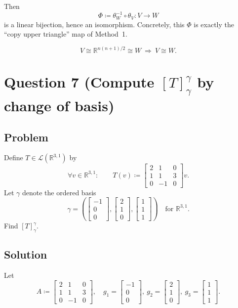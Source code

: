 \documentclass[12pt]{article}
\newcommand{\R}{\mathbb{R}}
\newcommand{\cL}{\mathcal{L}}
\begin{document}
Then
\[
\Phi \coloneqq \theta_W^{-1}\circ \theta_V:V\to W
\]
is a linear bijection, hence an isomorphism. Concretely, this $\Phi$ is exactly the ``copy upper triangle'' map of Method~1.

\[
\boxed{\,V\cong \R^{n(n+1)/2}\cong W\ \Rightarrow\ V\cong W.\,}
\]

\newpage
\section{Question 7 (Compute $[T]_{\gamma}^{\gamma}$ by change of basis)}
\subsection{Problem}
Define $T\in \cL(\R^{3,1})$ by
\[
\forall v\in \R^{3,1}:\qquad
T(v)\coloneqq
\begin{bmatrix}
2&1&0\\
1&1&3\\
0&-1&0
\end{bmatrix}v.
\]
Let $\gamma$ denote the ordered basis
\[
\gamma=\left(
\begin{bmatrix}-1\\0\\0\end{bmatrix},
\begin{bmatrix}2\\1\\0\end{bmatrix},
\begin{bmatrix}1\\1\\1\end{bmatrix}
\right)
\quad\text{for }\R^{3,1}.
\]
Find $[T]_{\gamma}^{\gamma}$.

\subsection{Solution}
Let
\[
A\coloneqq
\begin{bmatrix}
2&1&0\\
1&1&3\\
0&-1&0
\end{bmatrix},
\quad
g_1=\begin{bmatrix}-1\\0\\0\end{bmatrix},\ 
g_2=\begin{bmatrix}2\\1\\0\end{bmatrix},\ 
g_3=\begin{bmatrix}1\\1\\1\end{bmatrix}.
\]
\end{document}
